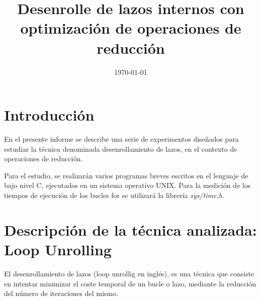 \documentclass[a4paper,twocolumn]{article}
\title{Desenrolle de lazos internos con optimización de operaciones de reducción} %
\date{\today} %
\begin{document}
	
	\maketitle
	
	
	\section{Introducción}

        En el presente informe se describe una serie de experimentos diseñados para estudiar la técnica denominada desenrollamiento de lazos, en el contexto de operaciones de reducción.
        
        Para el estudio, se realizarán varios programas breves escritos en el lenguaje de bajo nivel C, ejecutados en un sistema operativo UNIX. Para la medición de los tiempos de ejecución de los bucles for se utilizará la librería \textit{sys/time.h}.

 
	
	

	

\section{Descripción de la técnica analizada: Loop Unrolling}

El desenrollamiento de lazos (loop unrollig en inglés), es una técnica que consiste en intentar minimizar el coste temporal de un bucle o lazo, mediante la reducción del número de iteraciones del mismo. 
\end{document}
